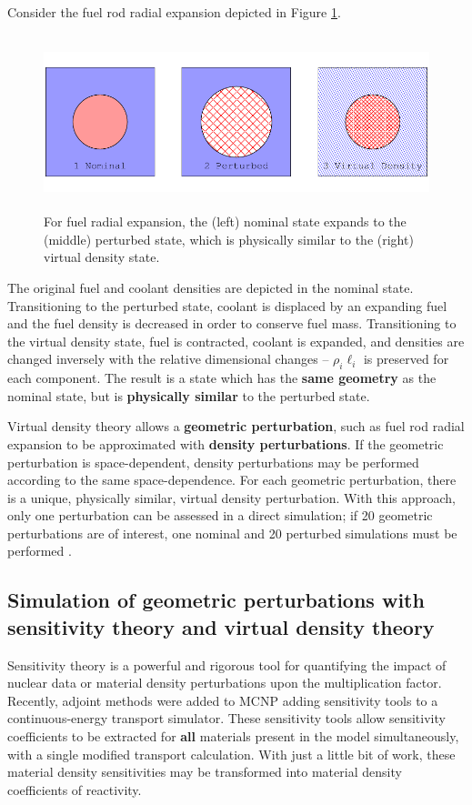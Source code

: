 \documentclass[10pt]{article}
\begin{document}
Consider the fuel rod radial expansion depicted in Figure \ref{fig:threeStates}.
\begin{figure}[ht!]
    \centering
    \includegraphics[height=2in]{./img/threeStates.pdf}
    \caption{For fuel radial expansion, the (left) nominal state expands to the (middle) perturbed state, which is physically similar to the (right) virtual density state.}
    \label{fig:threeStates}
\end{figure}
The original fuel and coolant densities are depicted in the nominal state.
Transitioning to the perturbed state, coolant is displaced by an expanding fuel and the fuel density is decreased in order to conserve fuel mass.
Transitioning to the virtual density state, fuel is contracted, coolant is expanded, and densities are changed inversely with the relative dimensional changes -- $\rho_i\ell_i$ is preserved for each component.
The result is a state which has the \textbf{same geometry} as the nominal state, but is \textbf{physically similar} to the perturbed state.

Virtual density theory allows a \textbf{geometric perturbation}, such as fuel rod radial expansion to be approximated with \textbf{density perturbations}.
If the geometric perturbation is space-dependent, density perturbations may be performed according to the same space-dependence.
For each geometric perturbation, there is a unique, physically similar, virtual density perturbation.
With this approach, only one perturbation can be assessed in a direct simulation; if 20 geometric perturbations are of interest, one nominal and 20 perturbed simulations must be performed \cite{reed2012vdp}.

\subsection{ Simulation of geometric perturbations with sensitivity theory and virtual density theory }

Sensitivity theory is a powerful and rigorous tool for quantifying the impact of nuclear data or material density perturbations upon the multiplication factor.
Recently, adjoint methods were added to MCNP \cite{mcnp6} adding sensitivity tools to a continuous-energy transport simulator.
These sensitivity tools allow sensitivity coefficients to be extracted for \textbf{all} materials present in the model simultaneously, with a single modified transport calculation.
With just a little bit of work, these material density sensitivities may be transformed into material density coefficients of reactivity.
\end{document}
